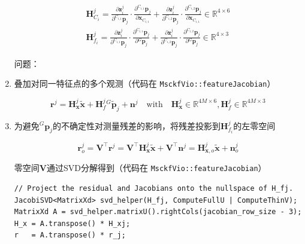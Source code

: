\documentclass[12pt,a4paper]{article}
\begin{document}
\begin{enumerate}
\begin{equation}
\begin{gathered}
\mathbf{H}_{C_i}^j = 
\frac{\partial \mathbf{z}_i^j}{\partial {}^{C_{i,1}}\mathbf{p}_j} \cdot 
\frac{\partial {}^{C_{i,1}}\mathbf{p}_j}{\partial \mathbf{x}_{C_{i,1}}} + 
\frac{\partial \mathbf{z}_i^j}{\partial {}^{C_{i,2}}\mathbf{p}_j} \cdot 
\frac{\partial {}^{C_{i,2}}\mathbf{p}_j}{\partial \mathbf{x}_{C_{i,1}}}
\in \mathbb{R}^{4 \times 6} \\
\mathbf{H}_{f_i}^j = 
\frac{\partial \mathbf{z}_i^j}{\partial {}^{C_{i,1}}\mathbf{p}_j} \cdot 
\frac{\partial {}^{C_{i,1}}\mathbf{p}_j}{\partial {}^G\mathbf{p}_j} +
\frac{\partial \mathbf{z}_i^j}{\partial {}^{C_{i,2}}\mathbf{p}_j} \cdot 
\frac{\partial {}^{C_{i,2}}\mathbf{p}_j}{\partial {}^G\mathbf{p}_j} 
\in \mathbb{R}^{4 \times 3}
\end{gathered}
\end{equation}

问题：{\color{red}{Modifty the measurement Jacobian to ensure observability constrain}}

\item 叠加对同一特征点的多个观测（代码在 \verb|MsckfVio::featureJacobian|）

\begin{equation*}
\mathbf{r}^j = 
\mathbf{H}_{\mathbf{x}}^j \tilde{\mathbf{x}} + 
\mathbf{H}_f^j {}^G\tilde{\mathbf{p}}_j + 
\mathbf{n}^j
\quad \text{with} \quad
\mathbf{H}_{\mathbf{x}}^j \in \mathbb{R}^{4M \times 6}, 
\mathbf{H}_f^j \in \mathbb{R}^{4M \times 3}
\end{equation*}


\item 为避免${}^G\mathbf{p}_j$的不确定性对测量残差的影响，将残差投影到$\mathbf{H}_{f_i}^j$的左零空间

\begin{equation}
\mathbf{r}^j_o 
= \mathbf{V}^\top \mathbf{r}^j
= \mathbf{V}^\top \mathbf{H}_{\mathbf{x}}^j\tilde{\mathbf{x}} +
\mathbf{V}^\top \mathbf{n}^j
= \mathbf{H}_{\mathbf{x}, o}^j\tilde{\mathbf{x}} + 
\mathbf{n}^j_o
\end{equation}

零空间$\mathbf{V}$通过SVD分解得到（代码在 \verb|MsckfVio::featureJacobian|）
\begin{lstlisting}
// Project the residual and Jacobians onto the nullspace of H_fj.
JacobiSVD<MatrixXd> svd_helper(H_fj, ComputeFullU | ComputeThinV);
MatrixXd A = svd_helper.matrixU().rightCols(jacobian_row_size - 3);
H_x = A.transpose() * H_xj;
r   = A.transpose() * r_j;
\end{lstlisting}


\end{enumerate}
\end{document}
